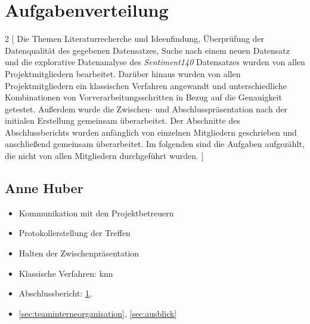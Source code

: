 \section{Aufgabenverteilung}\label{sec:aufgabenverteilung}

\begin{multicols}{2}
[
Die Themen Literaturrecherche und Ideenfindung, Überprüfung der Datenqualität des gegebenen Datensatzes, Suche nach einem neuen Datensatz und die explorative Datenanalyse des \textit{Sentiment140} Datensatzes wurden von allen Projektmitgliedern bearbeitet.
Darüber hinaus wurden von allen Projektmitgliedern ein klassischen Verfahren angewandt und unterschiedliche Kombinationen von Vorverarbeitungsschritten in Bezug auf die Genauigkeit getestet.
Außerdem wurde die Zwischen- und Abschlusspräsentation nach der initialen Erstellung gemeinsam überarbeitet.
Der Abschnitte des Abschlussberichts wurden anfänglich von einzelnen Mitgliedern geschrieben und anschließend gemeinsam überarbeitet.
Im folgenden sind die Aufgaben aufgezählt, die nicht von allen Mitgliedern durchgeführt wurden.
]

\subsection{Anne Huber}
\begin{itemize}
    \item Kommunikation mit den Projektbetreuern
    \item Protokollerstellung der Treffen
    \item Halten der Zwischenpräsentation
    \item Klassische Verfahren: \gls{knn}
    \item Abschlussbericht: \ref{sec:aufgabenverteilung}, \item \ref{sec:teaminterneorganisation}, \ref{sec:ausblick} 
\end{itemize}



\end{multicols}
